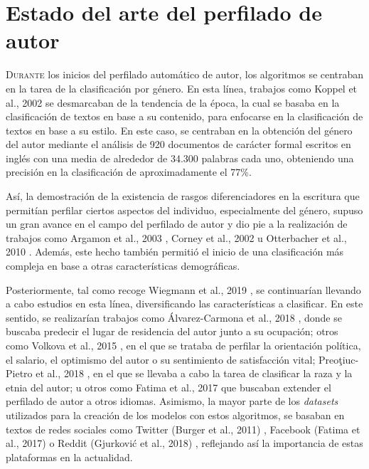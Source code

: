 \chapter{Estado del arte del perfilado de autor}
\label{chap:estadoarte}

\lettrine{D}{urante} los inicios del perfilado automático de autor, los algoritmos se centraban en la tarea de la clasificación por género.
En esta línea, trabajos como Koppel et al., 2002 \cite{koppel2002automatically} se desmarcaban de la tendencia de la época,
la cual se basaba en la clasificación de textos en base a su contenido, para enfocarse en la clasificación de textos en base a su estilo.
En este caso, se centraban en la obtención del género del autor mediante el análisis
de 920 documentos de carácter formal escritos en inglés con una media de alrededor de 34.300 palabras cada uno, obteniendo una precisión en la clasificación de
aproximadamente el 77\%.

\bigskip
Así, la demostración de la existencia de rasgos diferenciadores en la escritura que permitían perfilar ciertos aspectos del individuo, especialmente del género,
supuso un gran avance en el campo del perfilado de autor
y dio pie a la realización de trabajos como Argamon et al., 2003 \cite{argamon2003gender}, Corney et al., 2002 \cite{corney2002gender} u Otterbacher et al., 2010 \cite{otterbacher2010inferring}.
Además, este hecho también permitió el inicio de una clasificación más compleja en base a otras características demográficas.

\bigskip
Posteriormente, tal como recoge Wiegmann et al., 2019 \cite{wiegmann2019overview}, se continuarían llevando a cabo estudios en esta línea, diversificando
las características a clasificar. En este sentido, se realizarían trabajos como Álvarez-Carmona et al., 2018 \cite{alvarez2018overview}, donde se buscaba
predecir el lugar de residencia del autor junto a su ocupación; otros como Volkova et al., 2015 \cite{volkova2015predicting}, en el que se trataba de perfilar la orientación política,
el salario, el optimismo del autor o su sentimiento de satisfacción vital; Preoţiuc-Pietro et al., 2018 \cite{preoctiuc2018user}, en el que se llevaba a cabo la tarea de
clasificar la raza y la etnia del autor; u otros como Fatima et al., 2017 \cite{fatima2017multilingual} que buscaban extender el perfilado de autor a otros idiomas. Asimismo,
la mayor parte de los \textit{datasets} utilizados para la creación de los modelos con estos algoritmos, se basaban en textos de redes sociales como Twitter (Burger et al., 2011) \cite{burger2011discriminating},
Facebook (Fatima et al., 2017) \cite{fatima2017multilingual} o Reddit (Gjurković et al., 2018) \cite{gjurkovic2018reddit}, reflejando así la importancia de estas plataformas
en la actualidad.

